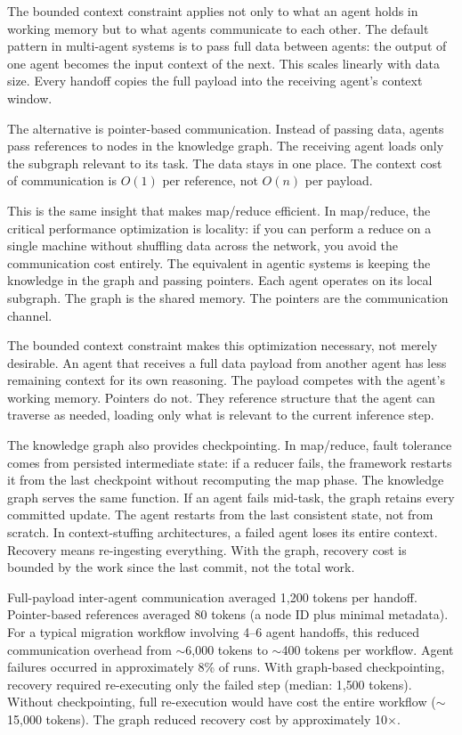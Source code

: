 \documentclass[11pt]{article}
\theoremstyle{definition}
\begin{document}
The bounded context constraint applies not only to what an agent holds
in working memory but to what agents communicate to each other. The
default pattern in multi-agent systems is to pass full data between
agents: the output of one agent becomes the input context of the next.
This scales linearly with data size. Every handoff copies the full
payload into the receiving agent's context window.

The alternative is pointer-based communication. Instead of passing
data, agents pass references to nodes in the knowledge graph. The
receiving agent loads only the subgraph relevant to its task. The
data stays in one place. The context cost of communication is $O(1)$
per reference, not $O(n)$ per payload.

This is the same insight that makes map/reduce efficient. In
map/reduce, the critical performance optimization is locality: if you
can perform a reduce on a single machine without shuffling data across
the network, you avoid the communication cost entirely. The equivalent
in agentic systems is keeping the knowledge in the graph and passing
pointers. Each agent operates on its local subgraph. The graph is the
shared memory. The pointers are the communication channel.

The bounded context constraint makes this optimization necessary, not
merely desirable. An agent that receives a full data payload from
another agent has less remaining context for its own reasoning. The
payload competes with the agent's working memory. Pointers do not.
They reference structure that the agent can traverse as needed,
loading only what is relevant to the current inference step.

The knowledge graph also provides checkpointing. In map/reduce,
fault tolerance comes from persisted intermediate state: if a reducer
fails, the framework restarts it from the last checkpoint without
recomputing the map phase. The knowledge graph serves the same
function. If an agent fails mid-task, the graph retains every
committed update. The agent restarts from the last consistent state,
not from scratch. In context-stuffing architectures, a failed agent
loses its entire context. Recovery means re-ingesting everything.
With the graph, recovery cost is bounded by the work since the last
commit, not the total work.

Full-payload inter-agent communication averaged 1{,}200 tokens per
handoff. Pointer-based references averaged 80 tokens (a node ID plus
minimal metadata). For a typical migration workflow involving 4--6
agent handoffs, this reduced communication overhead from $\sim$6{,}000
tokens to $\sim$400 tokens per workflow. Agent failures occurred in
approximately 8\% of runs. With graph-based checkpointing, recovery
required re-executing only the failed step (median: 1{,}500 tokens).
Without checkpointing, full re-execution would have cost the entire
workflow ($\sim$15{,}000 tokens). The graph reduced recovery cost by
approximately 10$\times$.
\end{document}
